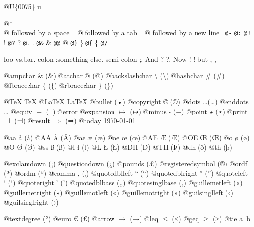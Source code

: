 \documentclass{book}
\renewcommand{\_}{\Texinfounderscore\discretionary{}{}{}}
\begin{document}
\begin{titlepage}
@U\{0075\} u

@* \leavevmode{}\\
@ followed by a space
\ {}
@ followed by a tab
\ {}
@ followed by a new line
\ {}\texttt{@-} \-{}
\texttt{@:} \@
\texttt{@!} \@!
\texttt{@?} \@?
\texttt{@.} \@.
\texttt{@\&} \&
\texttt{@@} @
\texttt{@\}} \}
\texttt{@\{} \{
\texttt{@/} 

foo vs.\@ bar. 
colon :\@And something else.
semi colon ;\@.
And ? ?\@.
Now ! !\@@
but , ,\@

@ampchar \& (\&)
@atchar @ (@)
@backslashchar \textbackslash{} (\textbackslash{})
@hashchar \# (\#)
@lbracechar \{ (\{)
@rbracechar \} (\})

@TeX \TeX{}
@LaTeX \LaTeX{}
@bullet \textbullet{} (•)
@copyright \copyright{} (©)
@dots \dots{}\@ (…)
@enddots \dots{}
@equiv $\equiv{}$ (≡)
@error 
@expansion $\mapsto{}$ (↦)
@minus - (−)
@point $\star{}$ (⋆)
@print $\dashv{}$ (⊣)
@result $\Rightarrow{}$ (⇒)
@today \today{}

@aa \aa{} (å)
@AA \AA{} (Å)
@ae \ae{} (æ)
@oe \oe{} (œ)
@AE \AE{} (Æ)
@OE \OE{} (Œ)
@o \o{} (ø)
@O \O{} (Ø)
@ss \ss{} (ß)
@l \l{} (ł)
@L \L{} (Ł)
@DH \DH{} (Ð)
@TH \TH{} (Þ)
@dh \dh{} (ð)
@th \th{} (þ)

@exclamdown \textexclamdown{} (¡)
@questiondown \textquestiondown{} (¿)
@pounds \textsterling{} (£)
@registeredsymbol \circledR{} (®)
@ordf \textordfeminine{} (ª)
@ordm \textordmasculine{} (º)
@comma , (,)
@quotedblleft \textquotedblleft{} (“)
@quotedblright \textquotedblright{} (”)
@quoteleft \textquoteleft{} (‘)
@quoteright \textquoteright{} (’)
@quotedblbase \quotedblbase{} („)
@quotesinglbase \quotesinglbase{} (‚)
@guillemetleft \guillemotleft{} («)
@guillemetright \guillemotright{} (»)
@guillemotleft \guillemotleft{} («)
@guillemotright \guillemotright{} (»)
@guilsinglleft \guilsinglleft{} (‹)
@guilsinglright \guilsinglright{} (›)

@textdegree \textdegree{} (°)
@euro \euro{} (€)
@arrow $\rightarrow{}$ (→)
@leq $\leq{}$ (≤)
@geq $\geq{}$ (≥)
@tie a~b


\end{titlepage}
\end{document}
